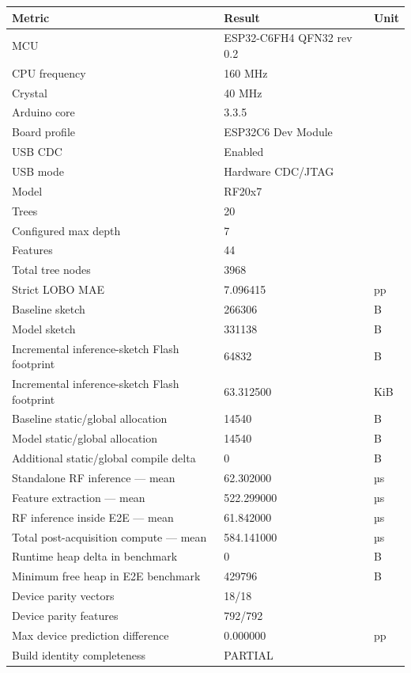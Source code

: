 \begin{tabular}{lll}
\toprule
Metric & Result & Unit \\
\midrule
MCU & ESP32-C6FH4 QFN32 rev 0.2 &  \\
CPU frequency & 160 MHz &  \\
Crystal & 40 MHz &  \\
Arduino core & 3.3.5 &  \\
Board profile & ESP32C6 Dev Module &  \\
USB CDC & Enabled &  \\
USB mode & Hardware CDC/JTAG &  \\
Model & RF20x7 &  \\
Trees & 20 &  \\
Configured max depth & 7 &  \\
Features & 44 &  \\
Total tree nodes & 3968 &  \\
Strict LOBO MAE & 7.096415 & pp \\
Baseline sketch & 266306 & B \\
Model sketch & 331138 & B \\
Incremental inference-sketch Flash footprint & 64832 & B \\
Incremental inference-sketch Flash footprint & 63.312500 & KiB \\
Baseline static/global allocation & 14540 & B \\
Model static/global allocation & 14540 & B \\
Additional static/global compile delta & 0 & B \\
Standalone RF inference — mean & 62.302000 & µs \\
Feature extraction — mean & 522.299000 & µs \\
RF inference inside E2E — mean & 61.842000 & µs \\
Total post-acquisition compute — mean & 584.141000 & µs \\
Runtime heap delta in benchmark & 0 & B \\
Minimum free heap in E2E benchmark & 429796 & B \\
Device parity vectors & 18/18 &  \\
Device parity features & 792/792 &  \\
Max device prediction difference & 0.000000 & pp \\
Build identity completeness & PARTIAL &  \\
\bottomrule
\end{tabular}
